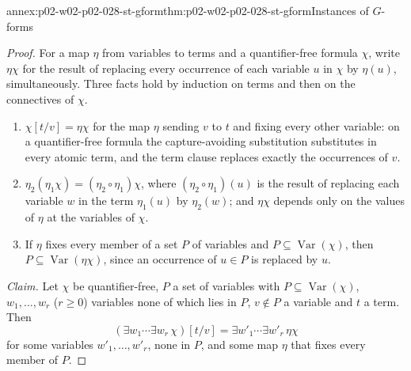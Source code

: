 \begin{annexitem}{annex:p02-w02-p02-028-st-gform}{thm:p02-w02-p02-028-st-gform}{Instances of \(G\)-forms}
\begin{proof}
For a map \(\eta\) from variables to terms and a quantifier-free formula
\(\chi\), write \(\eta\chi\) for the result of replacing every occurrence of
each variable \(u\) in \(\chi\) by \(\eta(u)\), simultaneously.  Three facts
hold by induction on terms and then on the connectives of \(\chi\).
\begin{enumerate}
  \item[(S1)] \(\chi[t/v]=\eta\chi\) for the map \(\eta\) sending \(v\) to
        \(t\) and fixing every other variable: on a quantifier-free formula
        the capture-avoiding substitution substitutes in every atomic term,
        and the term clause replaces exactly the occurrences of \(v\).
  \item[(S2)] \(\eta_2(\eta_1\chi)=(\eta_2\circ\eta_1)\chi\), where
        \((\eta_2\circ\eta_1)(u)\) is the result of replacing each variable
        \(w\) in the term \(\eta_1(u)\) by \(\eta_2(w)\); and \(\eta\chi\)
        depends only on the values of \(\eta\) at the variables of \(\chi\).
  \item[(S3)] If \(\eta\) fixes every member of a set \(P\) of variables and
        \(P\subseteq\operatorname{Var}(\chi)\), then
        \(P\subseteq\operatorname{Var}(\eta\chi)\), since an occurrence of
        \(u\in P\) is replaced by \(u\).
\end{enumerate}

\emph{Claim.}  Let \(\chi\) be quantifier-free, \(P\) a set of variables with
\(P\subseteq\operatorname{Var}(\chi)\), \(w_1,\ldots,w_r\) (\(r\geq0\))
variables none of which lies in \(P\), \(v\notin P\) a variable and \(t\) a
term.  Then
\[
  (\exists w_1\cdots\exists w_r\,\chi)[t/v]
  =\exists w'_1\cdots\exists w'_r\,\eta\chi
\]
for some variables \(w'_1,\ldots,w'_r\), none in \(P\), and some map
\(\eta\) that fixes every member of \(P\).


\end{proof}
\end{annexitem}
